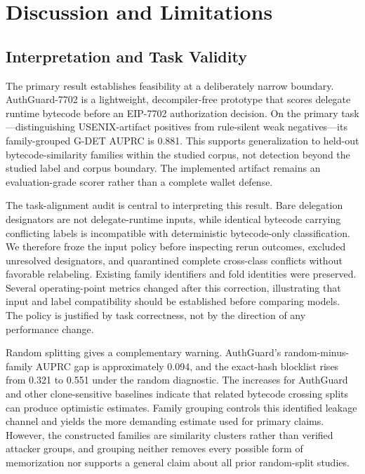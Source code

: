 \section{Discussion and Limitations}
\label{sec:discussion}

\subsection{Interpretation and Task Validity}

The primary result establishes feasibility at a deliberately narrow boundary. AuthGuard-7702 is a lightweight, decompiler-free prototype that scores delegate runtime bytecode before an EIP-7702 authorization decision. On the primary task---distinguishing USENIX-artifact positives from rule-silent weak negatives---its family-grouped G-DET AUPRC is 0.881. This supports generalization to held-out bytecode-similarity families within the studied corpus, not detection beyond the studied label and corpus boundary. The implemented artifact remains an evaluation-grade scorer rather than a complete wallet defense.

The task-alignment audit is central to interpreting this result. Bare delegation designators are not delegate-runtime inputs, while identical bytecode carrying conflicting labels is incompatible with deterministic bytecode-only classification. We therefore froze the input policy before inspecting rerun outcomes, excluded unresolved designators, and quarantined complete cross-class conflicts without favorable relabeling. Existing family identifiers and fold identities were preserved. Several operating-point metrics changed after this correction, illustrating that input and label compatibility should be established before comparing models. The policy is justified by task correctness, not by the direction of any performance change.

Random splitting gives a complementary warning. AuthGuard's random-minus-family AUPRC gap is approximately 0.094, and the exact-hash blocklist rises from 0.321 to 0.551 under the random diagnostic. The increases for AuthGuard and other clone-sensitive baselines indicate that related bytecode crossing splits can produce optimistic estimates. Family grouping controls this identified leakage channel and yields the more demanding estimate used for primary claims. However, the constructed families are similarity clusters rather than verified attacker groups, and grouping neither removes every possible form of memorization nor supports a general claim about all prior random-split studies.


